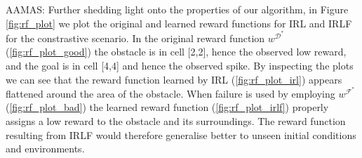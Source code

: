 \documentclass{aamas2016}
\newcommand{\aama}[1]{\textcolor{dim_gray}{AAMAS: #1}}
\begin{document}
\aama{Further shedding light onto the properties of our algorithm, in Figure \ref{fig:rf_plot} we plot the original and learned reward functions for IRL and IRLF for the constrastive scenario. In the original reward function $w^{\mathcal{D}^*}$ (\ref{fig:rf_plot_good}) the obstacle is in cell [2,2], hence the observed low reward, and the goal is in cell [4,4] and hence the observed spike. By inspecting the plots we can see that the reward function learned by IRL (\ref{fig:rf_plot_irl}) appears flattened around the area of the obstacle. When failure is used by employing $w^{\mathcal{F}^*}$ (\ref{fig:rf_plot_bad}) the learned reward function (\ref{fig:rf_plot_irlf}) properly assigns a low reward to the obstacle and its surroundings. The reward function resulting from IRLF would therefore generalise better to unseen initial conditions and environments.}


\end{document}
